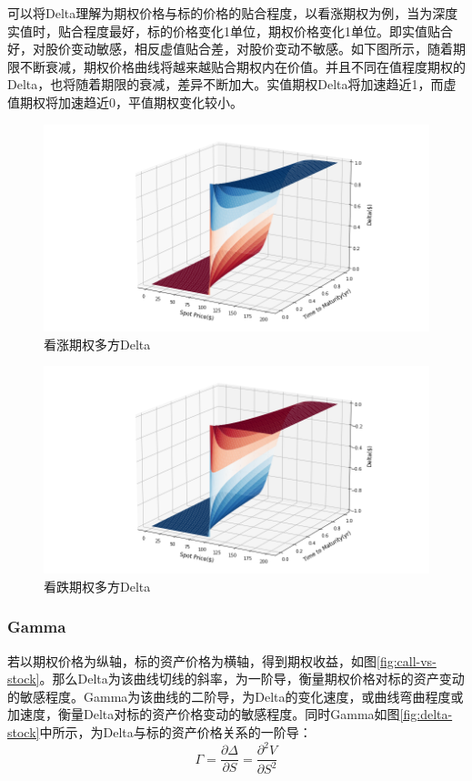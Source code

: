 \documentclass[11pt]{article}
\begin{document}
可以将Delta理解为期权价格与标的价格的贴合程度，以看涨期权为例，当为深度实值时，贴合程度最好，标的价格变化1单位，期权价格变化1单位。即实值贴合好，对股价变动敏感，相反虚值贴合差，对股价变动不敏感。如下图所示，随着期限不断衰减，期权价格曲线将越来越贴合期权内在价值。并且不同在值程度期权的Delta，也将随着期限的衰减，差异不断加大。实值期权Delta将加速趋近1，而虚值期权将加速趋近0，平值期权变化较小。
\begin{figure}[H]
    \centering
    \includegraphics[width=\textwidth]{fig/delta-call-surf.png}
    \caption{看涨期权多方Delta}
    \label{fig:delta-call-surf}
\end{figure}

\begin{figure}[H]
    \centering
    \includegraphics[width=\textwidth]{fig/delta-put-surf.png}
    \caption{看跌期权多方Delta}
    \label{fig:delta-put-surf}
\end{figure}

\subsubsection{Gamma}

若以期权价格为纵轴，标的资产价格为横轴，得到期权收益，如图\ref{fig:call-vs-stock}。那么Delta为该曲线切线的斜率，为一阶导，衡量期权价格对标的资产变动的敏感程度。Gamma为该曲线的二阶导，为Delta的变化速度，或曲线弯曲程度或加速度，衡量Delta对标的资产价格变动的敏感程度。同时Gamma如图\ref{fig:delta-stock}中所示，为Delta与标的资产价格关系的一阶导：
\begin{equation*}
    \Gamma = \frac{\partial \Delta}{\partial S} = \frac{\partial^2 V}{\partial S^2}
\end{equation*}
\end{document}
